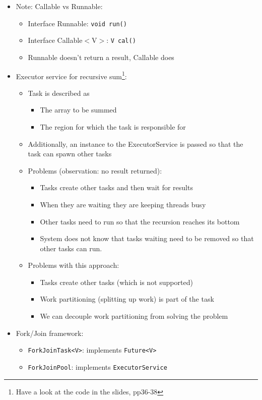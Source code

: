 \documentclass[a4paper]{article}
\newcommand{\inline}[1]{\lstinline!#1!}%
\begin{document}
\begin{itemize}
\item Note: Callable vs Runnable:
\begin{itemize}
\item Interface Runnable: \inline{void run()}
\item Interface Callable$<$V$>$: \inline{V cal()}
\item Runnable doesn’t return a result, Callable does
\end{itemize}
\item Executor service for recursive sum\footnote{Have a look at the code in the slides, pp36-38}: 
\begin{itemize}
\item Task is described as 
\begin{itemize}
\item The array to be summed
\item The region for which the task is responsible for
\end{itemize}
\item Additionally, an instance to the ExecutorService is passed so that the task can spawn other tasks
\item Problems (observation: no result returned): 
\begin{itemize}
\item Tasks create other tasks and then wait for results
\item When they are waiting they are keeping threads busy
\item Other tasks need to run so that the recursion reaches its bottom
\item System does not know that tasks waiting need to be removed so that other tasks can run. 
\end{itemize}
\item Problems with this approach:
\begin{itemize}
\item Tasks create other tasks (which is not supported)
\item Work partitioning (splitting up work) is part of the task
\item We can decouple work partitioning from solving the problem
\end{itemize}
\end{itemize}
\item Fork/Join framework:
\begin{itemize}
\item \inline{ForkJoinTask<V>}: implements \inline{Future<V>}
\item \inline{ForkJoinPool}: implements \inline{ExecutorService}

\end{itemize}
\end{itemize}
\end{document}
